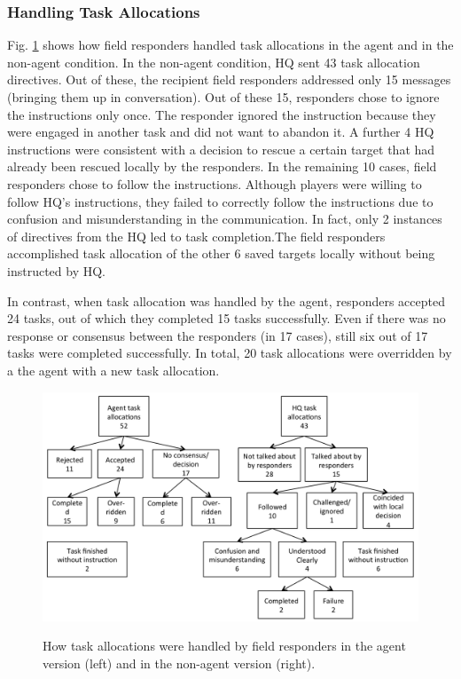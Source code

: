 \subsubsection{Handling Task Allocations}
\noindent Fig. \ref{fig:msgs} shows how field responders handled task allocations in the agent and in the non-agent condition. In the non-agent condition, HQ sent 43 task allocation directives. Out of these, the recipient field responders addressed only 15 messages (bringing them up in conversation). Out of these 15, responders chose to ignore the instructions only once. The responder ignored the instruction because they were engaged in another task and did not want to abandon it. A further 4 HQ instructions were consistent with a decision to rescue a certain target that had already been rescued locally by the responders. In the remaining 10 cases, field responders chose to follow the instructions. Although players were willing to follow HQ's instructions, they failed to correctly follow the instructions due to confusion and misunderstanding in the communication. In fact, only 2 instances of directives from the HQ led to task completion.The field responders accomplished task allocation of the other 6 saved targets locally without being instructed by HQ.

In contrast, when task allocation was handled by the agent, responders accepted 24 tasks, out of which they completed 15 tasks successfully. Even if there was no response or consensus between the responders (in 17 cases), still six out of 17 tasks were completed successfully. In total, 20 task allocations were overridden by a the agent with a new task allocation. 

\begin{figure}[htbp]
\includegraphics[width=\columnwidth]{message_handling.png}
\label{fig:msgs}\vspace{-3mm}
\caption{How task allocations were handled by field responders in the agent version (left) and in the non-agent version (right).\vspace{-3mm}}
\end{figure}

